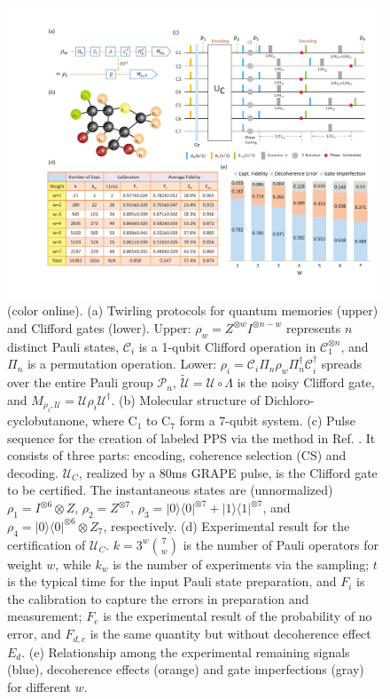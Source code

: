 \documentclass[prl,twocolumn,showpacs]{revtex4-1}
\newcommand{\bra}[1]{\langle #1|}
\newcommand{\ket}[1]{|#1\rangle}
\begin{document}
\begin{figure}[htb]
\begin{center}
\includegraphics[width=2\columnwidth]{everything2.pdf}
\end{center}
\setlength{\abovecaptionskip}{-0.35cm}
\caption{\footnotesize{(color online). (a) Twirling protocols for quantum memories (upper) and Clifford gates (lower). Upper: $\rho_w = Z^{\otimes w}I^{\otimes n-w}$ represents $n$ distinct Pauli states, $\mathcal{C}_i$ is a 1-qubit Clifford operation in $\mathcal{C}_1^{\otimes n}$, and $\Pi_n$ is a permutation operation. Lower: $\rho_{i} = \mathcal{C}_i \Pi_n \rho_{w} \Pi_n^{\dagger} \mathcal{C}_i^{\dagger}$ spreads over the entire Pauli group $\mathcal{P}_n$, $\tilde{\mathcal{U}} = \mathcal{U} \circ \Lambda$ is the noisy Clifford gate, and $M_{\rho_i, \mathcal{U}} = \mathcal{U} \rho_{i} \mathcal{U}^{\dagger}$. (b) Molecular structure of Dichloro-cyclobutanone, where C$_1$ to C$_7$ form a 7-qubit system. (c) Pulse sequence for the creation of labeled PPS via the method in Ref. \cite{Knill2000}. It consists of three parts: encoding, coherence selection (CS) and decoding. $\mathcal{U}_{C}$, realized by a 80ms GRAPE pulse, is the Clifford gate to be certified. The instantaneous states are (unnormalized) $\rho_1 = I^{\otimes 6}\otimes Z$,  $\rho_2 = Z^{\otimes 7}$, $\rho_3 = \ket{0}\bra{0}^{\otimes 7}+\ket{1}\bra{1}^{\otimes 7}$, and $\rho_4 =  \ket{0}\bra{0}^{\otimes 6} \otimes Z_7$, respectively. (d) Experimental result for the certification of $\mathcal{U}_{C}$. $k=3^w\binom{7}{w}$ is the number of Pauli operators for weight $w$, while $k_w$ is the number of experiments via the sampling; $t$ is the typical time for the input Pauli state preparation, and $F_i$ is the calibration to capture the errors in preparation and measurement; $F_e$ is the experimental result of the probability of no error, and $F_{d,c}$ is the same quantity but without decoherence effect $E_d$. (e) Relationship among the experimental remaining signals (blue), decoherence effects (orange) and gate imperfections (gray) for different $w$.}}\label{everything}
\end{figure}
\end{document}
